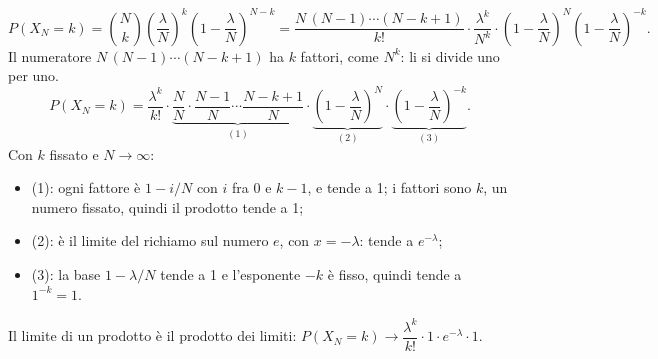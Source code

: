 \begin{dimostrazione}
\[ P(X_N = k) = \binom{N}{k} \left(\frac{\lambda}{N}\right)^k \left(1 - \frac{\lambda}{N}\right)^{N-k}
   = \frac{N\,(N-1) \cdots (N-k+1)}{k!} \cdot \frac{\lambda^k}{N^k} \cdot \left(1 - \frac{\lambda}{N}\right)^{N}
     \left(1 - \frac{\lambda}{N}\right)^{-k} . \]
 Il numeratore $N\,(N-1) \cdots (N-k+1)$ ha $k$ fattori, come $N^k$: li si divide uno
per uno.
\[ P(X_N = k) = \frac{\lambda^k}{k!} \cdot \underbrace{\frac{N}{N} \cdot \frac{N-1}{N} \cdots \frac{N-k+1}{N}}_{(1)}
   \cdot \underbrace{\left(1 - \frac{\lambda}{N}\right)^{N}}_{(2)} \cdot
   \underbrace{\left(1 - \frac{\lambda}{N}\right)^{-k}}_{(3)} . \]
 Con $k$ fissato e $N \to \infty$:
\begin{itemize}
  \item (1): ogni fattore è $1 - i/N$ con $i$ fra 0 e $k - 1$, e tende a 1; i fattori sono $k$, un numero fissato,
        quindi il prodotto tende a 1;
  \item (2): è il limite del richiamo sul numero $e$, con $x = -\lambda$: tende a $e^{-\lambda}$;
  \item (3): la base $1 - \lambda/N$ tende a 1 e l'esponente $-k$ è fisso, quindi tende a $1^{-k} = 1$.
\end{itemize}
 Il limite di un prodotto è il prodotto dei limiti:
$P(X_N = k) \to \dfrac{\lambda^k}{k!} \cdot 1 \cdot e^{-\lambda} \cdot 1$.
\end{dimostrazione}

